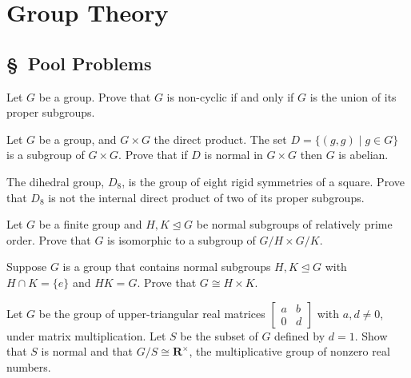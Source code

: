 \documentclass[11pt,twoside,openany]{memoir}
\begin{document}
\chapter*{Group Theory}
\section*{\S\ Pool Problems}
    \begin{exercise}
        Let $G$ be a group. Prove that $G$ is non-cyclic if and only if $G$ is the union of its proper subgroups.
        \end{exercise}
        
        \begin{exercise}
        Let $G$ be a group, and $G\times G$ the direct product. The set $D=\{(g,g)\mid g\in G\}$ is a subgroup of $G\times G$. Prove that if $D$ is normal in $G\times G$ then $G$ is abelian.
        \end{exercise}
        
        \begin{exercise}
        The dihedral group, $D_8$, is the group of eight rigid symmetries of a square. Prove that $D_8$ is not the internal direct product of two of its proper subgroups.
        \end{exercise}
        
        \begin{exercise}
        Let $G$ be a finite group and $H,K\mathrel{\unlhd}G$ be normal subgroups of relatively prime order. Prove that $G$ is isomorphic to a subgroup of $G/H\times G/K$.
        \end{exercise}
        
        \begin{exercise}
        Suppose $G$ is a group that contains normal subgroups $H,K\unlhd G$ with $H\cap K=\{e\}$ and $HK=G$. Prove that $G\cong H\times K$.
        \end{exercise}
        
        \begin{exercise}
        Let $G$ be the group of upper-triangular real matrices $\begin{bmatrix} a & b \\ 0 & d\end{bmatrix}$ with $a,d\neq 0$, under matrix multiplication. Let $S$ be the subset of $G$ defined by $d=1$. Show that $S$ is normal and that $G/S\cong \mathbf{R}^{\times}$, the multiplicative group of nonzero real numbers.
        \end{exercise}
        
\end{document}
